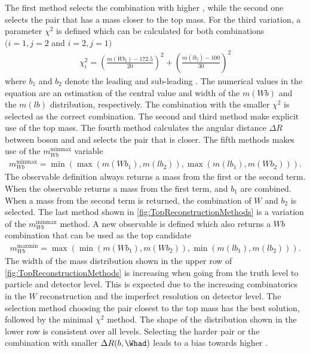 The first method selects the \Wb combination with higher \pt, while
the second one selects the pair that has a mass closer to the top mass.
For the third variation, a parameter \(\chi^2\) is defined which can be
calculated for both combinations \((i=1,j=2\) and \(i=2,j=1)\)
\begin{align*}
    \chi^2_i = {\left( \frac{m(Wb_i)-172.5}{20} \right)}^2 + {\left( \frac{m(lb_j)-100}{30}\right)}^2
\end{align*}
where \(b_1\) and \(b_2\) denote the leading and sub-leading \bjet.
The numerical values in the equation are an estimation of the central
value and width of the \(m(Wb)\) and the \(m(lb)\) distribution, respectively.
The \Wb combination with the smaller \(\chi^2\) is selected as the correct \Wb
combination. The second and third method make explicit use of the top mass.
The fourth method calculates the angular distance \(\Delta R\) between \Wboson
boson and \bjet and selects the pair that is closer.
The fifth methods makes use of the \(m_{Wb}^\mathrm{minmax}\) variable
\begin{align*}
    m_{Wb}^\mathrm{minmax} = \min\left( \max(m(Wb_1),m(lb_2)),\max(m(lb_1),m(Wb_2))\right).
\end{align*}
The observable definition always returns a mass from the first or the second
term. When the observable returns a mass from the first term, \Wboson and
\(b_1\) are combined. When a mass from the second term is returned,
the combination of \(W\) and \(b_2\) is selected.
The last method shown in \cref{fig:TopReconstructionMethods} is a variation
of the \(m_{Wb}^\mathrm{minmax}\) method.
A new observable is defined which also returns a \(Wb\) combination that can
be used as the top candidate
\begin{align*}
    m_{Wb}^\mathrm{maxmin} = \max\left( \min(m(Wb_1),m(Wb_2)),\min(m(lb_1),m(lb_2))\right).
\end{align*}
The width of the mass distribution shown in the upper row of
\cref{fig:TopReconstructionMethods} is increasing when going from the truth
level to particle and detector level. This is expected due to the increasing
combinatorics in the \(W\) reconstruction and the imperfect resolution
on detector level. The selection method choosing the pair closest to the
top mass has the best solution, followed by the minimal \(\chi^2\) method.
The shape of the \pt distribution shown in the lower row is consistent over
all levels. Selecting the harder \Wb pair or the combination with smaller
\(\Delta R(b,\Whad)\) leads to a bias towards higher \pt.

